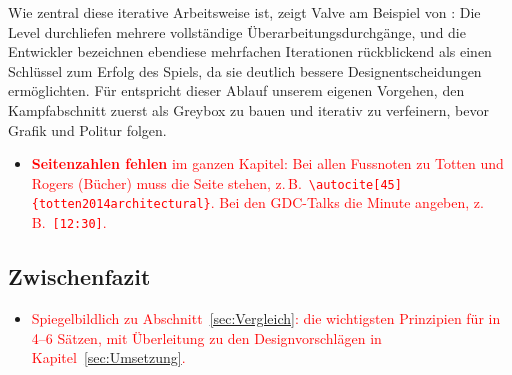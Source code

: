 \documentclass[../Main.tex]{subfiles}
\begin{document}
Wie zentral diese iterative Arbeitsweise ist, zeigt Valve am Beispiel von : Die Level durchliefen mehrere vollständige Überarbeitungsdurchgänge, und die Entwickler bezeichnen ebendiese mehrfachen Iterationen rückblickend als einen Schlüssel zum Erfolg des Spiels, da sie deutlich bessere Designentscheidungen ermöglichten.\autocite{jacobson2005postmortem} Für  entspricht dieser Ablauf unserem eigenen Vorgehen, den Kampfabschnitt zuerst als Greybox zu bauen und iterativ zu verfeinern, bevor Grafik und Politur folgen.

\begin{itemize}[leftmargin=1.5cm]
    \item \textcolor{red}{\textbf{Seitenzahlen fehlen} im ganzen Kapitel: Bei allen Fussnoten zu Totten und Rogers (Bücher) muss die Seite stehen, z.\,B.\ \texttt{\textbackslash autocite[45]\{totten2014architectural\}}. Bei den GDC-Talks die Minute angeben, z.\,B.\ \texttt{[12:30]}.}
\end{itemize}

\subsection{Zwischenfazit} \label{sec:ZwischenfazitLD}

\begin{itemize}[leftmargin=1.5cm]
    \item \textcolor{red}{Spiegelbildlich zu Abschnitt~\ref{sec:Vergleich}: die wichtigsten Prinzipien für  in 4--6 Sätzen, mit Überleitung zu den Designvorschlägen in Kapitel~\ref{sec:Umsetzung}.}
\end{itemize}
\end{document}
